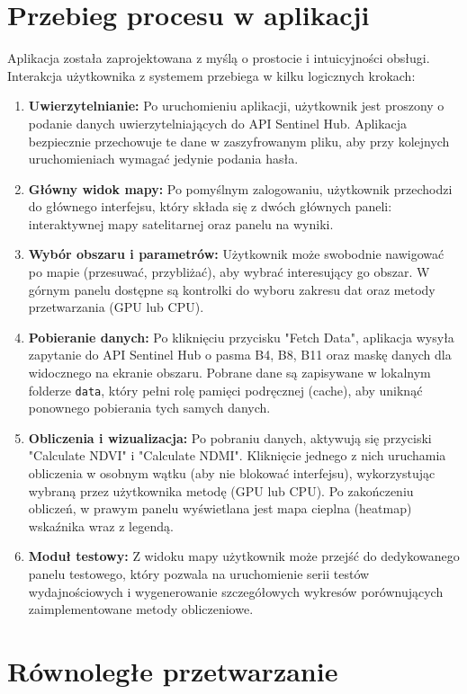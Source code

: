 \documentclass[12pt,a4paper]{article}
\begin{document}
\section{Przebieg procesu w aplikacji}
Aplikacja została zaprojektowana z myślą o prostocie i intuicyjności obsługi. Interakcja użytkownika z systemem przebiega w kilku logicznych krokach:
\begin{enumerate}
    \item \textbf{Uwierzytelnianie:} Po uruchomieniu aplikacji, użytkownik jest proszony o podanie danych uwierzytelniających do API Sentinel Hub. Aplikacja bezpiecznie przechowuje te dane w zaszyfrowanym pliku, aby przy kolejnych uruchomieniach wymagać jedynie podania hasła.
    \item \textbf{Główny widok mapy:} Po pomyślnym zalogowaniu, użytkownik przechodzi do głównego interfejsu, który składa się z dwóch głównych paneli: interaktywnej mapy satelitarnej oraz panelu na wyniki.
    \item \textbf{Wybór obszaru i parametrów:} Użytkownik może swobodnie nawigować po mapie (przesuwać, przybliżać), aby wybrać interesujący go obszar. W górnym panelu dostępne są kontrolki do wyboru zakresu dat oraz metody przetwarzania (GPU lub CPU).
    \item \textbf{Pobieranie danych:} Po kliknięciu przycisku "Fetch Data", aplikacja wysyła zapytanie do API Sentinel Hub o pasma B4, B8, B11 oraz maskę danych dla widocznego na ekranie obszaru. Pobrane dane są zapisywane w lokalnym folderze \texttt{data}, który pełni rolę pamięci podręcznej (cache), aby uniknąć ponownego pobierania tych samych danych.
    \item \textbf{Obliczenia i wizualizacja:} Po pobraniu danych, aktywują się przyciski "Calculate NDVI" i "Calculate NDMI". Kliknięcie jednego z nich uruchamia obliczenia w osobnym wątku (aby nie blokować interfejsu), wykorzystując wybraną przez użytkownika metodę (GPU lub CPU). Po zakończeniu obliczeń, w prawym panelu wyświetlana jest mapa cieplna (heatmap) wskaźnika wraz z legendą.
    \item \textbf{Moduł testowy:} Z widoku mapy użytkownik może przejść do dedykowanego panelu testowego, który pozwala na uruchomienie serii testów wydajnościowych i wygenerowanie szczegółowych wykresów porównujących zaimplementowane metody obliczeniowe.
\end{enumerate}

\section{Równoległe przetwarzanie}
\end{document}
